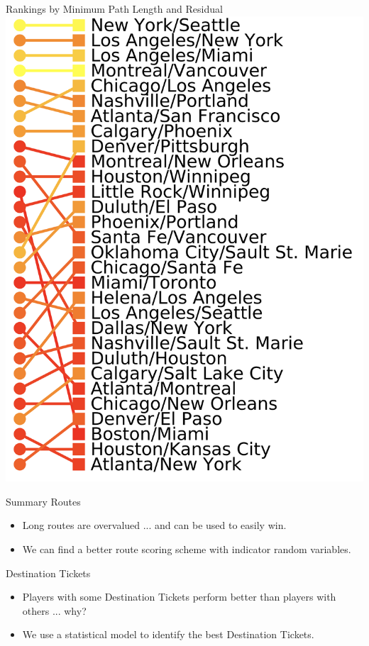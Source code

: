 \documentclass[12pt]{beamer}
\begin{document}
\begin{frame}{Rankings by Minimum Path Length and Residual}
    \centering
    \includegraphics[scale=.2]{figures/rankings}
\end{frame}

\begin{frame}{Summary}
    Routes
    \begin{itemize}
        \item Long routes are overvalued ... and can 
        be used to easily win.
        \item We can find a better route scoring scheme 
        with indicator random variables.
    \end{itemize}
    
    Destination Tickets
    \begin{itemize}
        \item Players with some Destination Tickets perform
        better than players with others ... why?
        \item We use a statistical model to identify
        the best Destination Tickets.
    \end{itemize}
    
\end{frame}
\end{document}
